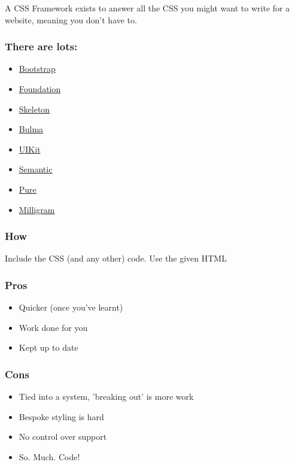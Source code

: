 A CSS Framework exists to answer all the CSS you might want to write for a website, meaning you don't have to.

\subsubsection{There are lots:}

\begin{itemize}
    \item \href{https://getbootstrap.com/}{Bootstrap}
    \item \href{https://get.foundation/}{Foundation}
    \item \href{http://getskeleton.com/}{Skeleton}
    \item \href{https://bulma.io/}{Bulma}
    \item \href{https://getuikit.com/}{UIKit}
    \item \href{https://semantic-ui.com/}{Semantic}
    \item \href{https://purecss.io/}{Pure}
    \item \href{https://milligram.io/}{Milligram}
\end{itemize}

\subsubsection{How}

Include the CSS (and any other) code. Use the given HTML

\subsubsection{Pros}

\begin{itemize}
    \item Quicker (once you've learnt)
    \item Work done for you
    \item Kept up to date
\end{itemize}


\subsubsection{Cons}

\begin{itemize}
    \item Tied into a system, 'breaking out' is more work
    \item Bespoke styling is hard
    \item No control over support
    \item So. Much. Code!
\end{itemize}

